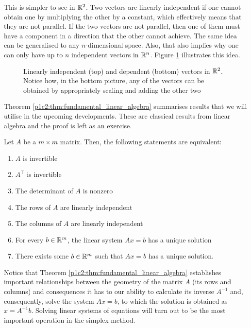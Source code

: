 This is simpler to see in $\mathbb{R}^2$. Two vectors are linearly independent if one cannot obtain one by multiplying the other by a constant, which effectively means that they are not parallel. If the two vectors are not parallel, then one of them must have a component in a direction that the other cannot achieve. The same idea can be generalised to any $n$-dimensional space. Also, that also implies why one can only have up to $n$ independent vectors in $\mathbb{R}^n$. Figure \ref{p1c2:fig:linear_independence} illustrates this idea. 

\begin{figure}[h]
	\centering
	\caption{Linearly independent (top) and dependent (bottom) vectors in $\mathbb{R}^2$. Notice how, in the bottom picture, any of the vectors can be obtained by appropriately scaling and adding the other two}\label{p1c2:fig:linear_independence}
\end{figure}

Theorem \ref{p1c2:thm:fundamental_linear_algebra} summarises results that we will utilise in the upcoming developments. These are classical results from linear algebra and the proof is left as an exercise.
%
\begin{theorem}[Inverses, linear independence, and solving $Ax = b$] \label{p1c2:thm:fundamental_linear_algebra}
	Let $A$ be a $m \times m$ matrix. Then, the following statements are equivalent:
	\begin{enumerate}
		\item $A$ is invertible
		\item $A^\top$ is invertible
		\item The determinant of $A$ is nonzero
		\item The rows of $A$ are linearly independent
		\item The columns of $A$ are linearly independent
		\item For every $b \in \mathbb{R}^m$, the linear system $Ax = b$ has a unique solution
		\item There exists some $b \in \mathbb{R}^m$ such that $Ax = b$ has a unique solution.	
	\end{enumerate}	
\end{theorem}
%
Notice that Theorem \ref{p1c2:thm:fundamental_linear_algebra} establishes important relationships between the geometry of the matrix $A$ (its rows and columns) and consequences it has to our ability to calculate its inverse $A^{-1}$ and, consequently, solve the system $Ax = b$, to which the solution is obtained as $x = A^{-1}b$. Solving linear systems of equations will turn out to be the most important operation in the simplex method.


